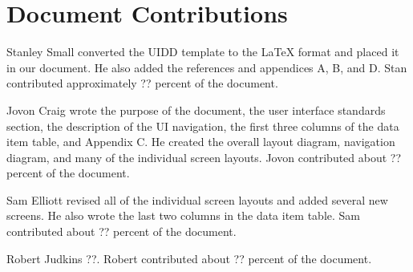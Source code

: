 \documentclass{article}
\begin{document}
\newpage
\section{Document Contributions}

Stanley Small converted the UIDD template to the LaTeX format and placed it in our document. He also added the references and appendices A, B, and D. Stan contributed approximately ?? percent of the document.

Jovon Craig wrote the purpose of the document, the user interface standards section, the description of the UI navigation, the first three columns of the data item table, and Appendix C. He created the overall layout diagram, navigation diagram, and many of the individual screen layouts. Jovon contributed about ?? percent of the document.

Sam Elliott revised all of the individual screen layouts and added several new screens. He also wrote the last two columns in the data item table. Sam contributed about ?? percent of the document.

Robert Judkins ??. Robert contributed about ?? percent of the document.

\newpage



\end{document}
